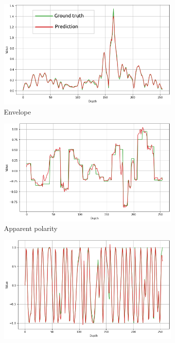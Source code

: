 \documentclass[conference]{IEEEtran}
\begin{document}
\begin{figure}[!t]
     \centering
     \begin{subfigure}[b]{\figcompwidth\textwidth}%
         \centering
        \includegraphics[width=1.0\columnwidth]{Fig/newFigs/envelope-trace.png}
        \caption{Envelope}
        \label{fig:etrace}
     \end{subfigure}
     \begin{subfigure}[b]{\figcompwidth\textwidth}
         \centering
        \includegraphics[width=1.0\columnwidth]{Fig/newFigs/apparent-polarity-trace.png}
        \caption{Apparent polarity}
        \label{fig:aptrace}
     \end{subfigure}
     \begin{subfigure}[b]{\figcompwidth\textwidth}
         \centering
        \includegraphics[width=1.0\columnwidth]{Fig/newFigs/cosine-instantaneous-phase-trace.png}

\end{subfigure}
\end{figure}
\end{document}
